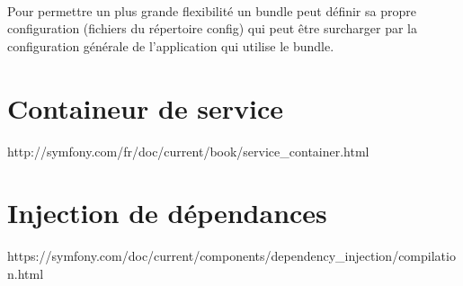 \paragraph{}
Pour permettre un plus grande flexibilité un bundle peut définir sa propre configuration (fichiers du répertoire config) qui peut être surcharger par la configuration générale de l'application qui utilise le bundle.
\section{Containeur de service}
http://symfony.com/fr/doc/current/book/service_container.html
\section{Injection de dépendances}
https://symfony.com/doc/current/components/dependency_injection/compilation.html